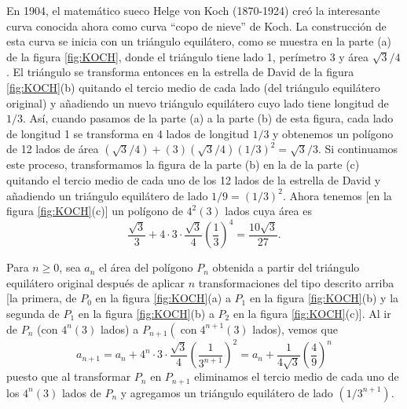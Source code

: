 \newpage

\begin{myexample}
    \begin{minipage}[l]{0.78\textwidth}
        En 1904, el matemático sueco Helge von Koch (1870-1924) creó la interesante curva conocida ahora como curva ``copo de nieve'' de Koch. La construcción de esta curva se inicia con un triángulo equilátero, como se muestra en la parte (a) de la figura \ref{fig:KOCH}, donde el triángulo tiene lado 1, perímetro 3 y área $\sqrt{3} / 4$. El triángulo se transforma entonces en la estrella de David de la figura \ref{fig:KOCH}(b) quitando el tercio medio de cada lado (del triángulo equilátero original) y añadiendo un nuevo triángulo equilátero cuyo lado tiene longitud de $1 / 3$. Así, cuando pasamos de la parte (a) a la parte (b) de esta figura, cada lado de longitud 1 se transforma en 4 lados de longitud $1 / 3$ y obtenemos un polígono de 12 lados de área $(\sqrt{3} / 4)+(3)(\sqrt{3} / 4)(1 / 3)^2=\sqrt{3} / 3$. Si continuamos este proceso, transformamos la figura de la parte (b) en la de la parte (c) quitando el tercio medio de cada uno de los 12 lados de la estrella de David y añadiendo un triángulo equilátero de lado $1 / 9 =(1 / 3)^2$. Ahora tenemos [en la figura \ref{fig:KOCH}(c)] un polígono de $4^2(3)$ lados cuya área es
        $$\frac{\sqrt{3}}{3} + 4 \cdot 3 \cdot \frac{\sqrt{3}}{4} \left(\frac{1}{3}\right)^4 = \frac{10\sqrt{3}}{27}.$$
        
        \hspace*{6mm}Para $n \geq 0$, sea $a_n$ el área del polígono $P_n$ obtenida a partir del triángulo equilátero original después de aplicar $n$ transformaciones del tipo descrito arriba [la primera, de $P_0$ en la figura \ref{fig:KOCH}(a) a $P_1$ en la figura \ref{fig:KOCH}(b) y la segunda de $P_1$ en la figura \ref{fig:KOCH}(b) a $P_2$ en la figura \ref{fig:KOCH}(c)]. Al ir de $P_n$ (con $4^n(3)$ lados) a $P_{n+1}\left(\operatorname{con} 4^{n+1}(3)\right.$ lados), vemos que
        \begin{equation}
            a_{n+1} = a_n + 4^n \cdot 3 \cdot \frac{\sqrt{3}}{4} \left(\frac{1}{3^{n+1}}\right)^2 = a_n + \frac{1}{4\sqrt{3}} \left(\frac{4}{9}\right)^n \label{JAKAKAKAKLAOPPQKKA}
        \end{equation}
        puesto que al transformar $P_n$ en $P_{n+1}$ eliminamos el tercio medio de cada uno de los $4^n(3)$ lados de $P_n$ y agregamos un triángulo equilátero de lado $\left(1 / 3^{n+1}\right)$.


\end{minipage}
\end{myexample}
